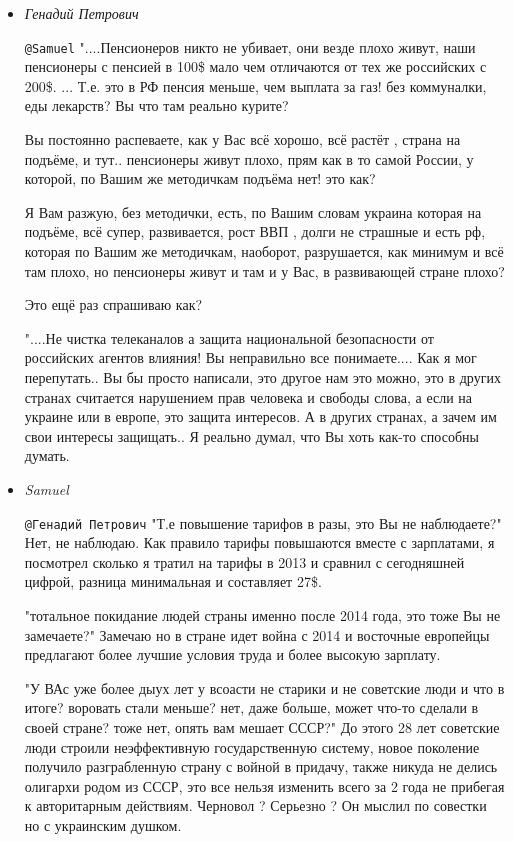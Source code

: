\begin{itemize}
\begin{itemize}
\item \emph{Генадий Петрович}

\verb|@Samuel|  "....Пенсионеров никто не убивает, они везде плохо живут, наши
пенсионеры с пенсией в 100\$ мало чем отличаются от тех же российских с 200\$.
... Т.е. это в РФ пенсия меньше, чем выплата за газ! без коммуналки, еды
лекарств? Вы что там реально курите?

Вы постоянно распеваете, как у Вас всё хорошо, всё растёт , страна на подъёме,
и тут.. пенсионеры живут плохо, прям как в то самой России, у которой, по
Вашим же методичкам подъёма нет! это как?

Я Вам разжую, без методички, есть, по Вашим словам украина которая на подъёме,
всё супер, развивается, рост ВВП , долги не страшные и есть рф, которая по
Вашим же методичкам, наоборот, разрушается, как минимум и всё там плохо, но
пенсионеры живут и там и у Вас, в развивающей стране плохо?

Это ещё раз спрашиваю как?

"....Не чистка телеканалов а защита национальной безопасности от российских
агентов влияния! Вы неправильно все понимаете.... Как я мог перепутать.. Вы бы
просто написали, это другое нам это можно, это в других странах считается
нарушением прав человека и свободы слова, а если на украине или в европе, это
защита интересов. А в других странах, а зачем им свои интересы защищать.. Я
реально думал, что Вы хоть как-то способны думать.

\item \emph{Samuel}

\verb|@Генадий Петрович|  "Т.е повышение тарифов в разы, это  Вы не наблюдаете?" Нет,
не наблюдаю. Как правило тарифы повышаются вместе с зарплатами, я посмотрел
сколько я тратил на тарифы в 2013 и сравнил с сегодняшней цифрой, разница
минимальная и составляет 27\$. 

"тотальное покидание людей страны именно после 2014 года, это тоже Вы не
замечаете?" Замечаю но в стране идет война с 2014 и восточные европейцы
предлагают более лучшие условия труда и более высокую зарплату. 

"У ВАс уже более дыух лет у всоасти не старики и не советские люди и что в
итоге? воровать стали меньше? нет, даже больше, может что-то сделали в своей
стране? тоже нет, опять вам мешает СССР?" До этого 28 лет советские люди
строили неэффективную государственную систему, новое поколение получило
разграбленную страну с войной в придачу, также никуда не делись олигархи родом
из СССР, это все нельзя изменить всего за 2 года не прибегая к авторитарным
действиям. Черновол ? Серьезно ? Он мыслил по совестки но с украинским душком.


\end{itemize}
\end{itemize}
